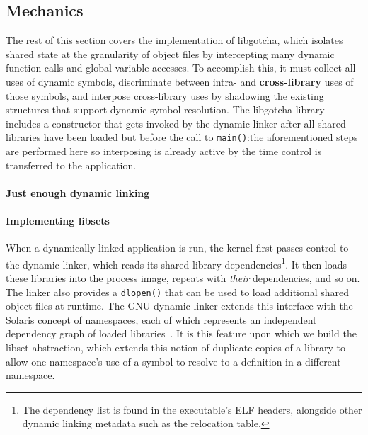 
\subsection{Mechanics}

The rest of this section covers the implementation of libgotcha, which isolates
shared state at the granularity of object files by intercepting many dynamic function
calls and global variable accesses.  To accomplish this, it must collect all uses of
dynamic symbols, discriminate between intra- and \textbf{cross-library} uses of those
symbols, and interpose cross-library uses by shadowing the existing structures that
support dynamic symbol resolution.  The libgotcha library includes a constructor that
gets invoked by the dynamic linker after all shared libraries have been loaded but
before the call to \texttt{main()}:\@ the aforementioned steps are performed here so
interposing is already active by the time control is transferred to the application.

\paragraph{Just enough dynamic linking}


\paragraph{Implementing libsets}

When a dynamically-linked application is run, the kernel first passes control to the
dynamic linker, which reads its shared library dependencies\footnote{The dependency
list is found in the executable's ELF headers, alongside other dynamic linking
metadata such as the relocation table.}.  It then loads these libraries into the
process image, repeats with
\textit{their} dependencies, and so on.  The linker also provides a \texttt{dlopen()}
that can be used to load additional shared object files at runtime.  The GNU dynamic
linker extends this interface with the Solaris concept of namespaces, each of which
represents an independent dependency graph of loaded
libraries~\cite{dlmopen-manpage}.  It is this feature upon which we build the libset
abstraction, which extends this notion of duplicate copies of a library to allow one
namespace's use of a symbol to resolve to a definition in a different namespace.

